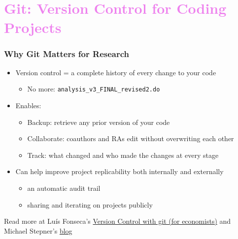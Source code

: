 \documentclass[aspectratio=169, 12pt]{beamer}
\begin{document}
\section{\textcolor{violet}{Git: Version Control for Coding Projects \vspace{0.3in}}}
\begin{frame}
\frametitle{Why Git Matters for Research}

\begin{itemize}
    \item Version control = a complete history of every change to your code
    \begin{itemize}
        \item No more: \texttt{analysis\_v3\_FINAL\_revised2.do}
    \end{itemize}
    \item Enables:
        \begin{itemize}
            \item[$\circ$] Backup: retrieve any prior version of your code
            \item[$\circ$] Collaborate: coauthors and RAs edit without overwriting each other
            \item[$\circ$] Track: what changed and who made the changes at every stage
        \end{itemize}
    \item Can help improve project replicability both internally and externally 
        \begin{itemize}
            \item an automatic audit trail
            \item sharing and iterating on projects publicly
        \end{itemize}
\end{itemize}
\vfill
\footnotesize Read more at Lu\'{i}s Fonseca's \href{https://luispfonseca.com/files/slides\_git.pdf}{Version Control with git (for economists)} and Michael Stepner's \href{https://michaelstepner.com/blog/git-vs-dropbox/}{blog}
\end{frame}
\end{document}
